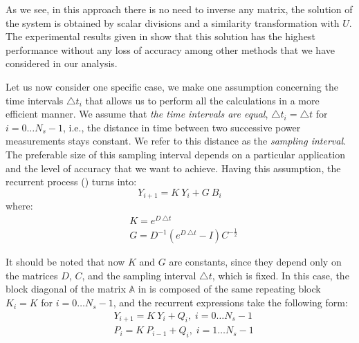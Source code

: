 As we see, in this approach there is no need to inverse any matrix, the solution of the system is obtained by scalar divisions and a similarity transformation with $U$. The experimental results given in  show that this solution has the highest performance without any loss of accuracy among other methods that we have considered in our analysis.

Let us now consider one specific case, we make one assumption concerning the time intervals $\triangle t_i$ that allows us to perform all the calculations in a more efficient manner. We assume that \emph{the time intervals are equal}, $\triangle t_i = \triangle t$ for $i = 0 \dots N_s - 1$, i.e., the distance in time between two successive power measurements stays constant. We refer to this distance as the \emph{sampling interval}. The preferable size of this sampling interval depends on a particular application and the level of accuracy that we want to achieve. Having this assumption, the recurrent process () turns into:
\[
  Y_{i+1} = K \: Y_i + G \: B_i
\]
where:
\begin{align*}
  & K = e^{D \: \triangle t} \\
  & G = D^{-1} \left( e^{D \: \triangle t} - I \right) C^{-\frac{1}{2}}
\end{align*}

It should be noted that now $K$ and $G$ are constants, since they depend only on the matrices $D$, $C$, and the sampling interval $\triangle t$, which is fixed. In this case, the block diagonal of the matrix $\mathbb{A}$ in  is composed of the same repeating block $K_i = K$ for $i = 0 \dots N_s - 1$, and the recurrent expressions take the following form:
\begin{align}
  & Y_{i + 1} = K \: Y_i + Q_i, \; i = 0 \dots N_s - 1 \nonumber \\
  & P_i = K \: P_{i - 1} + Q_i, \; i = 1 \dots N_s - 1 \nonumber
\end{align}
